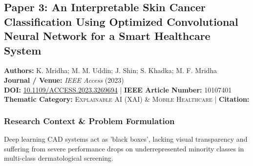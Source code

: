 \subsection{Paper 3: An Interpretable Skin Cancer Classification Using Optimized Convolutional Neural Network for a Smart Healthcare System}
\label{sec:paper_3}

\begin{tcolorbox}[colback=gray!5!white,colframe=gray!75!black,title=\textbf{Metadata \& Citation Summary}]
\textbf{Authors:} K. Mridha; M. M. Uddin; J. Shin; S. Khadka; M. F. Mridha \\
\textbf{Journal / Venue:} \textit{IEEE Access} (2023) \\
\textbf{DOI:} \href{https://doi.org/10.1109/ACCESS.2023.3269694}{10.1109/ACCESS.2023.3269694} \quad | \quad \textbf{IEEE Article Number:} 10107401 \\
\textbf{Thematic Category:} \textsc{Explainable AI (XAI) \& Mobile Healthcare} \quad | \quad \textbf{Citation:} \cite{10107401}
\end{tcolorbox}

\subsubsection*{Research Context \& Problem Formulation}
Deep learning CAD systems act as 'black boxes', lacking visual transparency and suffering from severe performance drops on underrepresented minority classes in multi-class dermatological screening.

